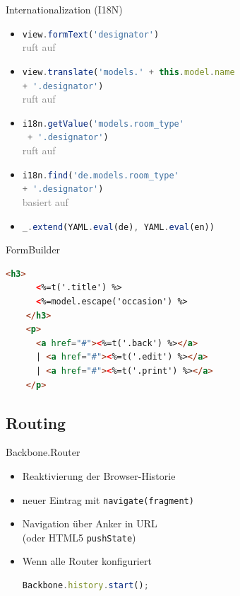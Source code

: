\begin{frame}{Internationalization (I18N)}
  \begin{itemize}
    \item \lstinline[language=JavaScript]-view.formText('designator')-\\
      \hfill\textcolor{gray}{ruft auf}\hfill\strut
    \item \lstinline[language=JavaScript]-view.translate('models.' + this.model.name-\\
      \qquad  \lstinline[language=JavaScript]-+ '.designator')-\\
      \hfill\textcolor{gray}{ruft auf}\hfill\strut
    \item \lstinline[language=JavaScript]-i18n.getValue('models.room_type'-\\
      \qquad \lstinline[language=JavaScript]- + '.designator')-\\
      \hfill\textcolor{gray}{ruft auf}\hfill\strut
    \item \lstinline[language=JavaScript]-i18n.find('de.models.room_type'- \\
      \qquad \lstinline[language=JavaScript]-+ '.designator')-\\
      \hfill\textcolor{gray}{basiert auf}\hfill\strut
    \item \lstinline[language=JavaScript]-_.extend(YAML.eval(de), YAML.eval(en))-
  \end{itemize}
\end{frame}

\begin{frame}[fragile]{FormBuilder}
  \begin{lstlisting}[language=HTML,gobble=4]
    <h3>
      <%=t('.title') %>
      <%=model.escape('occasion') %>
    </h3>
    <p>
      <a href="#"><%=t('.back') %></a>
      | <a href="#"><%=t('.edit') %></a>
      | <a href="#"><%=t('.print') %></a>
    </p>
  \end{lstlisting}
\end{frame}

\subsection{Routing}

\begin{frame}[fragile]{Backbone.Router}
  \begin{itemize}
    \item Reaktivierung der Browser-Historie
    \item neuer Eintrag mit \lstinline-navigate(fragment)-
    \item Navigation über Anker in URL \\
      (oder HTML5 \lstinline-pushState-)
    \item Wenn alle Router konfiguriert \\
      \begin{lstlisting}[language=JavaScript,gobble=8]
        Backbone.history.start();
      \end{lstlisting}
  \end{itemize}
\end{frame}

